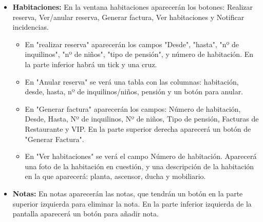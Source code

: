 \documentclass[spanish,a4paper,12pt]{report}		%
\begin{document}
\begin{itemize}
\begin{itemize}
					 \item \textbf{Habitaciones: }En la ventana habitaciones aparecerán los botones: Realizar reserva, Ver/anular reserva, Generar factura, Ver habitaciones y Notificar incidencias. 
					\begin{itemize}		
							\item En "realizar reserva" aparecerán los campos "Desde", "hasta", "nº de inquilinos", "nº de niños", "tipo de pensión", y número de habitación. En la parte inferior habrá un tick y una cruz.
							\item En "Anular reserva" se verá una tabla con las columnas: habitación, desde, hasta, nº de inquilinos/niños, pensión y un botón para anular.\\
							\item En "Generar factura" aparecerán los campos: Número de habitación, Desde, Hasta, Nº de inquilinos, Nº de niños, Tipo de pensión, Facturas de Restaurante y VIP. En la parte superior derecha aparecerá un botón de "Generar Factura". \\
							\item En "Ver habitaciones" se verá el campo Número de habitación. Aparecerá una foto de la habitación en cuestión, y una descripción de la habitación en la que aparecerá: planta, ascensor, ducha y mobiliario. 
					\end{itemize}
					 \item \textbf{Notas: }En notas aparecerán las notas, que tendrán un botón en la parte superior izquierda para eliminar la nota. En la parte inferior izquierda de la pantalla aparecerá un botón para añadir nota. 
				\end{itemize}
				

\end{itemize}
\end{document}
